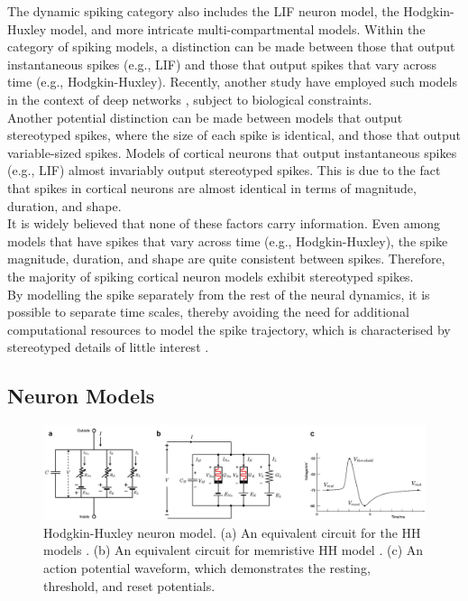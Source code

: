 \noindent The dynamic spiking category also includes the LIF neuron model, the Hodgkin-Huxley model, and more intricate multi-compartmental models. Within the category of spiking models, a distinction can be made between those that output instantaneous spikes (e.g., LIF) and those that output spikes that vary across time (e.g., Hodgkin-Huxley). Recently, another study have employed such models in the context of deep networks \cite{guerguiev2017towards}, subject to biological constraints. \\

\noindent Another potential distinction can be made between models that output stereotyped spikes, where the size of each spike is identical, and those that output variable-sized spikes. Models of cortical neurons that output instantaneous spikes (e.g., LIF) almost invariably output stereotyped spikes. This is due to the fact that spikes in cortical neurons are almost identical in terms of magnitude, duration, and shape.\\

\noindent It is widely believed that none of these factors carry information. Even among models that have spikes that vary across time (e.g., Hodgkin-Huxley), the spike magnitude, duration, and shape are quite consistent between spikes. Therefore, the majority of spiking cortical neuron models exhibit stereotyped spikes. \\

\noindent By modelling the spike separately from the rest of the neural dynamics, it is possible to separate time scales, thereby avoiding the need for additional computational resources to model the spike trajectory, which is characterised by stereotyped details of little interest \cite{abbott1999lapicque}. \\

\subsection[Neuron Models]{Neuron Models}

\begin{figure}[htbp!] 
\centering    
\includegraphics[width=1\textwidth]{Chapter2/Figs/2c.png}
\caption[Hodgkin-Huxley neuron model.]{Hodgkin-Huxley neuron model. (a) An equivalent circuit for the HH models \cite{hodgkin1952quantitative}. (b) An equivalent circuit for memristive HH model \cite{chua2012hodgkin}. (c) An action potential waveform, which demonstrates the resting, threshold, and reset potentials. }
\label{fig:2c}
\end{figure}

